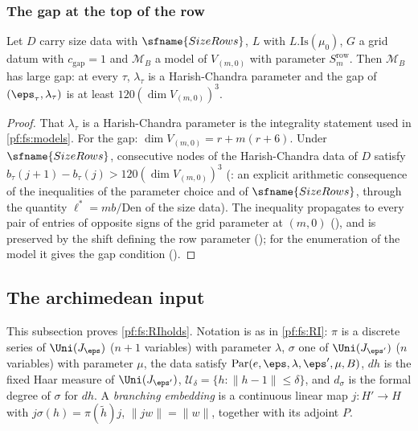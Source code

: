 \subsubsection{The gap at the top of the row}

\begin{lemma}\label{pf:fs:gap}
Let $D$ carry size data with $\sfname{SizeRows}$, $L$ with $L.\mathrm{Is}(\mu_0)$, $G$ a grid datum with $c_{\mathrm{gap}}=1$ and
$\mathcal M_B$ a model of $V_{(m,0)}$ with parameter $S^{\mathrm{row}}_m$. Then $\mathcal M_B$ has large gap: at every $\tau$, $\lambda_\tau$ is
a Harish-Chandra parameter and the gap of $(\eps_\tau,\lambda_\tau)$ is at least $120(\dim V_{(m,0)})^3$.
\end{lemma}

\begin{proof}
That $\lambda_\tau$ is a Harish-Chandra parameter is the integrality statement used in \cref{pf:fs:models}. For the gap: $\dim V_{(m,0)}=r+m(r+6)$.
Under $\sfname{SizeRows}$, consecutive nodes of the Harish-Chandra data of $D$ satisfy $b_\tau(j+1)-b_\tau(j)>120(\dim V_{(m,0)})^3$
(: an explicit arithmetic consequence of the inequalities of the parameter choice
and of $\sfname{SizeRows}$, through the quantity $\ell^*=mb/\mathrm{Den}$ of the size data). The inequality propagates to every pair of
entries of opposite signs of the grid parameter at $(m,0)$ (), and is preserved by the
shift defining the row parameter
(); for the enumeration of the model it gives the gap condition
().
\end{proof}

\subsection{The archimedean input}\label{sec:pf:fs:real}

This subsection proves \cref{pf:fs:RIholds}. Notation is as in \cref{pf:fs:RI}: $\pi$ is a discrete series of $\Uni(J_\eps)$
($n+1$ variables) with parameter $\lambda$, $\sigma$ one of $\Uni(J_{\eps'})$ ($n$ variables) with parameter $\mu$, the data satisfy
$\mathrm{Par}(e,\eps,\lambda,\eps',\mu,B)$, $dh$ is the fixed Haar measure of $\Uni(J_{\eps'})$, $\mathcal U_\delta=\{h:\|h-1\|\le\delta\}$,
and $d_\sigma$ is the formal degree of $\sigma$ for $dh$. A \emph{branching embedding} is a continuous linear map $j\colon H'\to H$
with $j\sigma(h)=\pi(\tilde h)j$, $\|jw\|=\|w\|$, together with its adjoint $P$.

